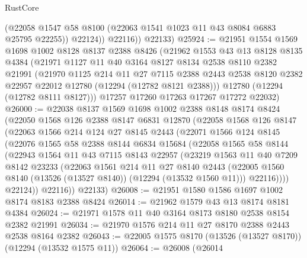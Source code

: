 \begin{lexlean}{RustCore}
\begin{coremodule}
              (@22058 @1547 @58 @8100 (@22063 @1541 @1023 @11 @43 @8084 @6883 @25795 @22255))
              @22124))
          @22116))
      @22133)
@25924 := @21951
    @1554
    @1569
    @1698
    @1002
    @8128
    @8137
    @2388
    @8426
    (@21962
      @1553
      @43
      @13
      @8128
      @8135
      @4384
      (@21971
        @1127
        @11
        @40
        @3164
        @8127
        @8134
        @2538
        @8110
        @2382
        @21991
        (@21970
          @1125
          @214
          @11
          @27
          @7115
          @2388
          @2443
          @2538
          @8120
          @2382
          @22957
          @22012
          @12780
          (@12294 (@12782 @8121 @2388)))
        @12780
        (@12294 (@12782 @8111 @8127)))
      @17257
      @17260
      @17263
      @17267
      @17272
      @22032)
@26000 := @22038
    @8137
    @1569
    @1698
    @1002
    @2388
    @8148
    @8174
    @8424
    (@22050
      @1568
      @126
      @2388
      @8147
      @6831
      @12870
      (@22058
        @1568
        @126
        @8147
        (@22063
          @1566
          @214
          @124
          @27
          @8145
          @2443
          (@22071
            @1566
            @124
            @8145
            (@22076
              @1565
              @58
              @2388
              @8144
              @6834
              @15684
              (@22058
                @1565
                @58
                @8144
                (@22943
                  @1564
                  @11
                  @43
                  @7115
                  @8143
                  @22957
                  (@23219
                    @1563
                    @11
                    @40
                    @7209
                    @8142
                    @23233
                    (@22063
                      @1561
                      @214
                      @11
                      @27
                      @8140
                      @2443
                      (@22005 @1560 @8140 (@13526 (@13527 @8140)) (@12294 (@13532 @1560 @11)))
                      @22116))))
              @22124))
          @22116))
      @22133)
@26008 := @21951 @1580 @1586 @1697 @1002 @8174 @8183 @2388 @8424
@26014 := @21962 @1579 @43 @13 @8174 @8181 @4384
@26024 := @21971 @1578 @11 @40 @3164 @8173 @8180 @2538 @8154 @2382 @21991
@26034 := @21970 @1576 @214 @11 @27 @8170 @2388 @2443 @2538 @8164 @2382
@26043 := @22005 @1575 @8170 (@13526 (@13527 @8170)) (@12294 (@13532 @1575 @11))
@26064 := @26008
    (@26014

\end{coremodule}
\end{lexlean}
